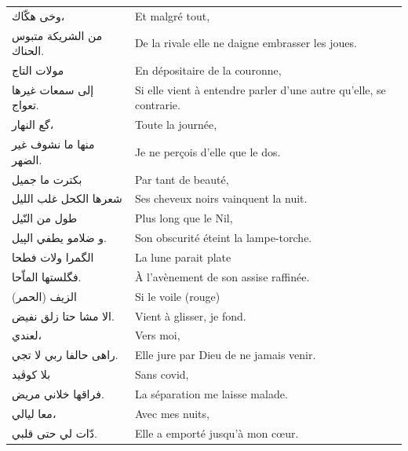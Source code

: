 \begin{longtable}{R{0.3\textwidth} L{0.65\textwidth}}
  \textarabic{وخى هكّاك،}                   &       Et malgré tout,   \\  %
  \textarabic{من الشريكة متبوس الحناك.}    &       De la rivale elle ne daigne embrasser les joues.   \bigskip \\ 
  \textarabic{مولات التاج}                  &       En dépositaire de la couronne,   \\  %
  \textarabic{إلى سمعات غيرها تعواج.}      &       Si elle vient à entendre parler d’une autre qu’elle, se contrarie.   \bigskip \\ 
  \textarabic{گع النهار،}                  &       Toute la journée,   \\  %
  \textarabic{منها ما نشوف غير الضهر.}     &       Je ne perçois d’elle que le dos.   \bigskip \\ 
  \textarabic{بكترت ما جميل}               &       Par tant de beauté,   \\  %
  \textarabic{شعرها الكحل غلب الليل}       &       Ses cheveux noirs vainquent la nuit.   \bigskip \\ 
  \textarabic{طول من النّيل}                &       Plus long que le Nil,   \\  %
  \textarabic{و ضلامو يطفي الپيل.}          &       Son obscurité éteint la lampe-torche.   \bigskip \\ 
  \textarabic{الگمرا ولات فطحا}             &       La lune parait plate  \\  %
  \textarabic{فگلستها الماّحا.}             &       À l’avènement de son assise raffinée.   \bigskip \\ 
  \textarabic{الزيف  (الحمر)}         &       Si le voile  (rouge)   \\  %
  \textarabic{الا مشا حتا زلق نفيض.}        &       Vient à glisser, je fond.   \bigskip \\ 
  \textarabic{لعندي،}                      &       Vers moi,   \\  %
  \textarabic{راهى حالفا ربي لا تجي.}       &       Elle jure par Dieu de ne jamais venir.   \bigskip \\ 
  \textarabic{بلا كوڤيد}                    &       Sans covid,   \\  %
  \textarabic{فراقها خلاني مريض.}            &       La séparation me laisse malade. \bigskip \\ 
  \textarabic{معا ليالي،}                  &       Avec mes nuits,   \\  %
  \textarabic{دّات لي حتى قلبي.}            &       Elle a emporté jusqu’à mon cœur.   \bigskip \\ 

\end{longtable}
